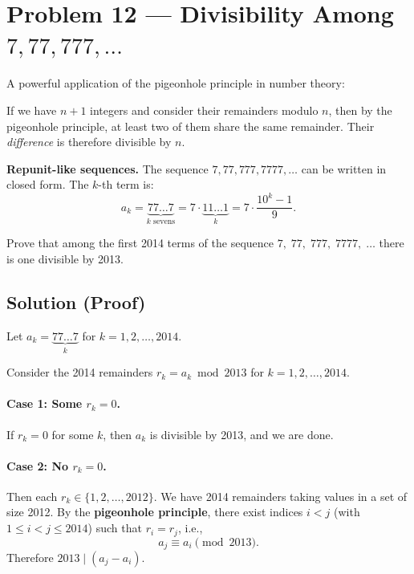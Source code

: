 \documentclass[12pt, a4paper]{article}
\begin{document}
\section{Problem 12 --- Divisibility Among \texorpdfstring{$7, 77, 777, \ldots$}{7, 77, 777, ...}}

\begin{theorybox}
A powerful application of the pigeonhole principle in number theory:

\medskip
If we have $n+1$ integers and consider their remainders modulo $n$,
then by the pigeonhole principle, at least two of them share the
same remainder. Their \emph{difference} is therefore divisible by $n$.

\medskip
\textbf{Repunit-like sequences.}\;
The sequence $7, 77, 777, 7777, \ldots$ can be written in closed form.
The $k$-th term is:
\[
  a_k = \underbrace{77\ldots7}_{k \text{ sevens}}
      = 7 \cdot \underbrace{11\ldots1}_{k}
      = 7 \cdot \frac{10^k - 1}{9}.
\]
\end{theorybox}

\begin{problembox}
Prove that among the first 2014 terms of the sequence
$7,\; 77,\; 777,\; 7777,\; \ldots$
there is one divisible by 2013.
\end{problembox}

\subsection*{Solution (Proof)}

Let $a_k = \underbrace{77\ldots7}_{k}$ for $k = 1, 2, \ldots, 2014$.

Consider the 2014 remainders $r_k = a_k \bmod 2013$ for $k = 1, 2, \ldots, 2014$.

\paragraph{Case 1: Some $r_k = 0$.}
If $r_k = 0$ for some $k$, then $a_k$ is divisible by 2013, and we are done.

\paragraph{Case 2: No $r_k = 0$.}
Then each $r_k \in \{1, 2, \ldots, 2012\}$.
We have 2014 remainders taking values in a set of size 2012.
By the \textbf{pigeonhole principle}, there exist indices $i < j$
(with $1 \le i < j \le 2014$) such that $r_i = r_j$, i.e.,
\[
  a_j \equiv a_i \pmod{2013}.
\]
Therefore $2013 \mid (a_j - a_i)$.
\end{document}
